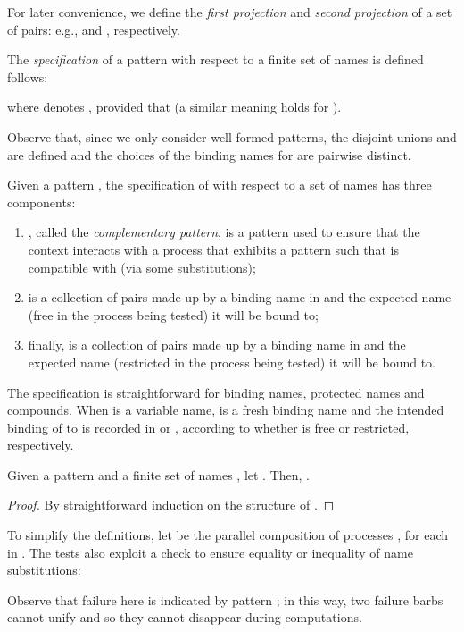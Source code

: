 \documentclass{LMCS}
\begin{document}
For later convenience, we define the {\em first projection}  and
{\em second projection}  of a set of pairs: e.g.,
 and , respectively.


\begin{defi}
\label{def:bchar}
The {\em specification}  of a pattern  with respect to a finite set of names  is defined follows:

where  denotes , provided that 
(a similar meaning holds for ).
\end{defi}
Observe that, since we only consider well formed patterns, the disjoint unions  and  are defined and the choices of the binding names for  are pairwise distinct.

Given a pattern , the specification  of  with respect to a set of names  has three components:
\begin{enumerate}
\item , called the {\em complementary pattern}, is a pattern used to ensure that the context interacts with a 
process that exhibits a pattern  such that  is compatible with  (via some substitutions);
\item  is a collection of pairs  made up by a binding name in  and the expected 
name (free in the process being tested) it will be bound to;
\item finally,  is a collection of pairs  made up by a binding name in  and the expected
name (restricted in the process being tested) it will be bound to.
\end{enumerate}

\noindent The specification is straightforward for binding names, protected names and compounds.
When  is a variable name,  is a fresh binding name  and the intended binding of  to  
is recorded in  or , according to whether  is free or restricted, respectively.

\begin{lem}
\label{prop:spec-pp}
Given a pattern  and a finite set of names , let .
Then, .
\end{lem}
\begin{proof}
By straightforward induction on the structure of .
\end{proof}
\enlargethispage{\baselineskip}

To simplify the definitions, let  be the parallel composition of 
processes , for each  in . 
The tests also exploit a check  to ensure equality or 
inequality of name substitutions:

Observe that failure here is indicated by pattern ; in this way,
two failure barbs cannot unify and so they cannot disappear during computations.
\end{document}
